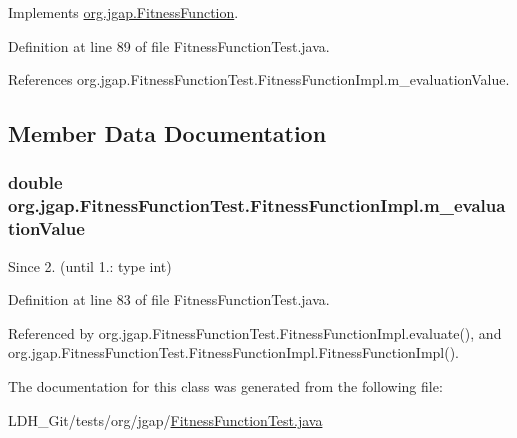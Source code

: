 Implements \hyperlink{classorg_1_1jgap_1_1_fitness_function_a0078e42480eac93729f906ac4dc185d9}{org.\-jgap.\-Fitness\-Function}.



Definition at line 89 of file Fitness\-Function\-Test.\-java.



References org.\-jgap.\-Fitness\-Function\-Test.\-Fitness\-Function\-Impl.\-m\-\_\-evaluation\-Value.



\subsection{Member Data Documentation}
\hypertarget{classorg_1_1jgap_1_1_fitness_function_test_1_1_fitness_function_impl_a4d6f85bdff6993727519b1de36aa49cb}{
\subsubsection[{m\-\_\-evaluation\-Value}]{\setlength{\rightskip}{0pt plus 5cm}double org.\-jgap.\-Fitness\-Function\-Test.\-Fitness\-Function\-Impl.\-m\-\_\-evaluation\-Value\hspace{0.3cm}{\ttfamily [private]}}}\label{classorg_1_1jgap_1_1_fitness_function_test_1_1_fitness_function_impl_a4d6f85bdff6993727519b1de36aa49cb}
\begin{DoxySince}{Since}
2. (until 1.\-: type int) 
\end{DoxySince}


Definition at line 83 of file Fitness\-Function\-Test.\-java.



Referenced by org.\-jgap.\-Fitness\-Function\-Test.\-Fitness\-Function\-Impl.\-evaluate(), and org.\-jgap.\-Fitness\-Function\-Test.\-Fitness\-Function\-Impl.\-Fitness\-Function\-Impl().



The documentation for this class was generated from the following file\-:\begin{DoxyCompactItemize}
\item 
L\-D\-H\-\_\-\-Git/tests/org/jgap/\hyperlink{_fitness_function_test_8java}{Fitness\-Function\-Test.\-java}\end{DoxyCompactItemize}
